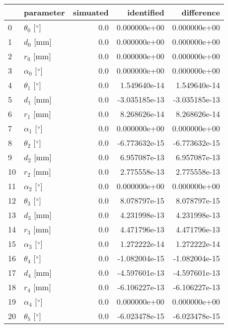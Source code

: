 \documentclass{standalone}%
\begin{document}
%
\normalsize%
\begin{tabular}{llrrr}
\toprule
{} &                 parameter & simuated &    identified &    difference \\
\midrule
0  &  $\theta_{0}$ [$\degree$] &      0.0 &  0.000000e+00 &  0.000000e+00 \\
1  &              $d_{0}$ [mm] &      0.0 &  0.000000e+00 &  0.000000e+00 \\
2  &              $r_{0}$ [mm] &      0.0 &  0.000000e+00 &  0.000000e+00 \\
3  &  $\alpha_{0}$ [$\degree$] &      0.0 &  0.000000e+00 &  0.000000e+00 \\
4  &  $\theta_{1}$ [$\degree$] &      0.0 &  1.549640e-14 &  1.549640e-14 \\
5  &              $d_{1}$ [mm] &      0.0 & -3.035185e-13 & -3.035185e-13 \\
6  &              $r_{1}$ [mm] &      0.0 &  8.268626e-14 &  8.268626e-14 \\
7  &  $\alpha_{1}$ [$\degree$] &      0.0 &  0.000000e+00 &  0.000000e+00 \\
8  &  $\theta_{2}$ [$\degree$] &      0.0 & -6.773632e-15 & -6.773632e-15 \\
9  &              $d_{2}$ [mm] &      0.0 &  6.957087e-13 &  6.957087e-13 \\
10 &              $r_{2}$ [mm] &      0.0 &  2.775558e-13 &  2.775558e-13 \\
11 &  $\alpha_{2}$ [$\degree$] &      0.0 &  0.000000e+00 &  0.000000e+00 \\
12 &  $\theta_{3}$ [$\degree$] &      0.0 &  8.078797e-15 &  8.078797e-15 \\
13 &              $d_{3}$ [mm] &      0.0 &  4.231998e-13 &  4.231998e-13 \\
14 &              $r_{3}$ [mm] &      0.0 &  4.471796e-13 &  4.471796e-13 \\
15 &  $\alpha_{3}$ [$\degree$] &      0.0 &  1.272222e-14 &  1.272222e-14 \\
16 &  $\theta_{4}$ [$\degree$] &      0.0 & -1.082004e-15 & -1.082004e-15 \\
17 &              $d_{4}$ [mm] &      0.0 & -4.597601e-13 & -4.597601e-13 \\
18 &              $r_{4}$ [mm] &      0.0 & -6.106227e-13 & -6.106227e-13 \\
19 &  $\alpha_{4}$ [$\degree$] &      0.0 &  0.000000e+00 &  0.000000e+00 \\
20 &  $\theta_{5}$ [$\degree$] &      0.0 & -6.023478e-15 & -6.023478e-15 \\

\end{tabular}
\end{document}
